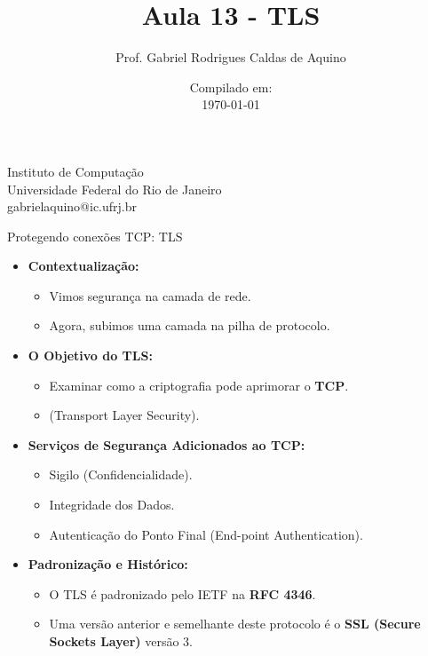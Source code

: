 \title{Aula 13 - TLS}

\author{Prof. Gabriel Rodrigues Caldas de Aquino}

\institute
{
    Instituto de Computação \\
    Universidade Federal do Rio de Janeiro\\
    gabrielaquino@ic.ufrj.br%
}
\date{Compilado em: \\ \today} %




\begin{frame}
    \titlepage
\end{frame}

\begin{frame}{Protegendo conexões TCP: TLS}
    \begin{itemize}
        \item \textbf{Contextualização:}
              \begin{itemize}
                  \item Vimos segurança na camada de rede.
                  \item Agora, subimos uma camada na pilha de protocolo.
              \end{itemize}

        \item \textbf{O Objetivo do TLS:}
              \begin{itemize}
                  \item Examinar como a criptografia pode aprimorar o \textbf{TCP}.
                  \item (Transport Layer Security).
              \end{itemize}

        \item \textbf{Serviços de Segurança Adicionados ao TCP:}
              \begin{itemize}
                  \item Sigilo (Confidencialidade).
                  \item Integridade dos Dados.
                  \item Autenticação do Ponto Final (End-point Authentication).
              \end{itemize}

        \item \textbf{Padronização e Histórico:}
              \begin{itemize}
                  \item O TLS é padronizado pelo IETF na \textbf{RFC 4346}.
                  \item Uma versão anterior e semelhante deste protocolo é o \textbf{SSL (Secure Sockets Layer)} versão 3.
              \end{itemize}
    \end{itemize}
\end{frame}


